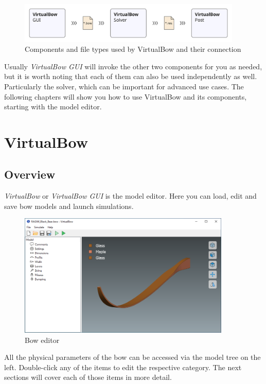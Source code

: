 \documentclass[12pt]{article}
\begin{document}
\begin{figure}[H]
\centering
\includegraphics[width=0.95\textwidth]{figures/overview}
\caption{Components and file types used by VirtualBow and their connection}
\label{fig:overview}
\end{figure}

Usually \textit{VirtualBow GUI} will invoke the other two components for you as needed, but it is worth noting that each of them can also be used independently as well.
Particularly the solver, which can be important for advanced use cases.
The following chapters will show you how to use VirtualBow and its components, starting with the model editor.

\newpage
\section{VirtualBow}

\subsection{Overview}

\textit{VirtualBow} or \textit{VirtualBow GUI} is the model editor.
Here you can load, edit and save bow models and launch simulations.

\begin{figure}[H]
\centering
\includegraphics[width=0.9\textwidth]{figures/screenshots/input/bow-editor}
\caption{Bow editor}
\label{fig:bow-editor}
\end{figure}

All the physical parameters of the bow can be accessed via the model tree on the left.
Double-click any of the items to edit the respective category.
The next sections will cover each of those items in more detail.
\end{document}
